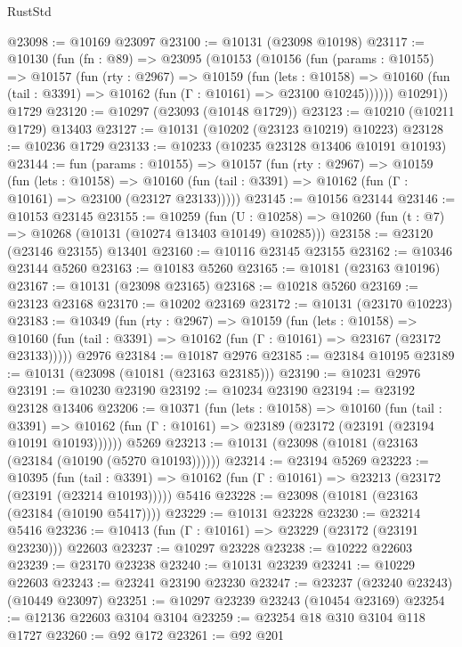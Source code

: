 \begin{lexlean}{RustStd}
\begin{coremodule}
@23098 := @10169 @23097
@23100 := @10131 (@23098 @10198)
@23117 := @10130
    (fun (fn : @89) =>
    @23095
      (@10153
        (@10156
          (fun (params : @10155) =>
          @10157
            (fun (rty : @2967) =>
            @10159
              (fun (lets : @10158) =>
              @10160 (fun (tail : @3391) => @10162 (fun (Γ : @10161) => @23100 @10245))))))
        @10291))
    @1729
@23120 := @10297 (@23093 (@10148 @1729))
@23123 := @10210 (@10211 @1729) @13403
@23127 := @10131 (@10202 (@23123 @10219) @10223)
@23128 := @10236 @1729
@23133 := @10233 (@10235 @23128 @13406 @10191 @10193)
@23144 := fun (params : @10155) =>
  @10157
    (fun (rty : @2967) =>
    @10159
      (fun (lets : @10158) =>
      @10160 (fun (tail : @3391) => @10162 (fun (Γ : @10161) => @23100 (@23127 @23133)))))
@23145 := @10156 @23144
@23146 := @10153 @23145
@23155 := @10259
    (fun (U : @10258) => @10260 (fun (t : @7) => @10268 (@10131 (@10274 @13403 @10149) @10285)))
@23158 := @23120 (@23146 @23155) @13401
@23160 := @10116 @23145 @23155
@23162 := @10346 @23144 @5260
@23163 := @10183 @5260
@23165 := @10181 (@23163 @10196)
@23167 := @10131 (@23098 @23165)
@23168 := @10218 @5260
@23169 := @23123 @23168
@23170 := @10202 @23169
@23172 := @10131 (@23170 @10223)
@23183 := @10349
    (fun (rty : @2967) =>
    @10159
      (fun (lets : @10158) =>
      @10160 (fun (tail : @3391) => @10162 (fun (Γ : @10161) => @23167 (@23172 @23133)))))
    @2976
@23184 := @10187 @2976
@23185 := @23184 @10195
@23189 := @10131 (@23098 (@10181 (@23163 @23185)))
@23190 := @10231 @2976
@23191 := @10230 @23190
@23192 := @10234 @23190
@23194 := @23192 @23128 @13406
@23206 := @10371
    (fun (lets : @10158) =>
    @10160
      (fun (tail : @3391) =>
      @10162 (fun (Γ : @10161) => @23189 (@23172 (@23191 (@23194 @10191 @10193))))))
    @5269
@23213 := @10131 (@23098 (@10181 (@23163 (@23184 (@10190 (@5270 @10193))))))
@23214 := @23194 @5269
@23223 := @10395
    (fun (tail : @3391) => @10162 (fun (Γ : @10161) => @23213 (@23172 (@23191 (@23214 @10193)))))
    @5416
@23228 := @23098 (@10181 (@23163 (@23184 (@10190 @5417))))
@23229 := @10131 @23228
@23230 := @23214 @5416
@23236 := @10413 (fun (Γ : @10161) => @23229 (@23172 (@23191 @23230))) @22603
@23237 := @10297 @23228
@23238 := @10222 @22603
@23239 := @23170 @23238
@23240 := @10131 @23239
@23241 := @10229 @22603
@23243 := @23241 @23190 @23230
@23247 := @23237 (@23240 @23243) (@10449 @23097)
@23251 := @10297 @23239 @23243 (@10454 @23169)
@23254 := @12136 @22603 @3104 @3104
@23259 := @23254 @18 @310 @3104 @118 @1727
@23260 := @92 @172
@23261 := @92 @201

\end{coremodule}
\end{lexlean}
